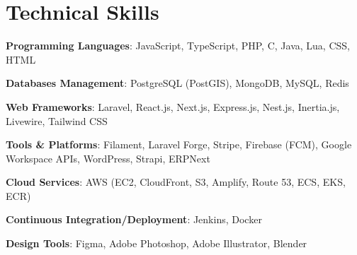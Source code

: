 \section{Technical Skills}
\begin{itemize}[leftmargin=0.15in, label={}, itemsep=-0.04in]
	\small{
	\item \textbf{Programming Languages}: JavaScript, TypeScript, PHP, C, Java, Lua, CSS, HTML
	\item \textbf{Databases Management}: PostgreSQL (PostGIS), MongoDB, MySQL, Redis
	\item \textbf{Web Frameworks}: Laravel, React.js, Next.js, Express.js, Nest.js, Inertia.js, Livewire, Tailwind CSS
	\item \textbf{Tools \& Platforms}:  Filament, Laravel Forge, Stripe, Firebase (FCM), Google Workspace APIs, WordPress, Strapi, ERPNext
	\item \textbf{Cloud Services}: AWS (EC2, CloudFront, S3, Amplify, Route 53, ECS, EKS, ECR)
	\item \textbf{Continuous Integration/Deployment}: Jenkins, Docker
    \item \textbf{Design Tools}: Figma, Adobe Photoshop, Adobe Illustrator, Blender
	      }
\end{itemize}
